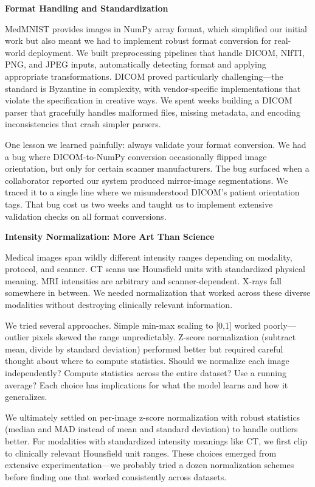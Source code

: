 \documentclass[12pt,a4paper]{article}
\begin{document}
\textbf{Format Handling and Standardization}

MedMNIST provides images in NumPy array format, which simplified our initial work but also meant we had to implement robust format conversion for real-world deployment. We built preprocessing pipelines that handle DICOM, NIfTI, PNG, and JPEG inputs, automatically detecting format and applying appropriate transformations. DICOM proved particularly challenging—the standard is Byzantine in complexity, with vendor-specific implementations that violate the specification in creative ways. We spent weeks building a DICOM parser that gracefully handles malformed files, missing metadata, and encoding inconsistencies that crash simpler parsers.

One lesson we learned painfully: always validate your format conversion. We had a bug where DICOM-to-NumPy conversion occasionally flipped image orientation, but only for certain scanner manufacturers. The bug surfaced when a collaborator reported our system produced mirror-image segmentations. We traced it to a single line where we misunderstood DICOM's patient orientation tags. That bug cost us two weeks and taught us to implement extensive validation checks on all format conversions.

\textbf{Intensity Normalization: More Art Than Science}

Medical images span wildly different intensity ranges depending on modality, protocol, and scanner. CT scans use Hounsfield units with standardized physical meaning. MRI intensities are arbitrary and scanner-dependent. X-rays fall somewhere in between. We needed normalization that worked across these diverse modalities without destroying clinically relevant information.

We tried several approaches. Simple min-max scaling to [0,1] worked poorly—outlier pixels skewed the range unpredictably. Z-score normalization (subtract mean, divide by standard deviation) performed better but required careful thought about where to compute statistics. Should we normalize each image independently? Compute statistics across the entire dataset? Use a running average? Each choice has implications for what the model learns and how it generalizes.

We ultimately settled on per-image z-score normalization with robust statistics (median and MAD instead of mean and standard deviation) to handle outliers better. For modalities with standardized intensity meanings like CT, we first clip to clinically relevant Hounsfield unit ranges. These choices emerged from extensive experimentation—we probably tried a dozen normalization schemes before finding one that worked consistently across datasets.
\end{document}
